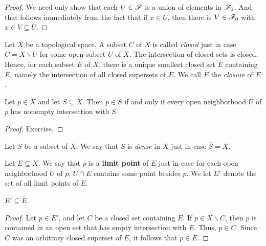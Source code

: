 \begin{proof} We need only show that each $U\in\mathscr F$ is a union of
  elements in $\mathscr F _0$.  And that follows immediately from the fact
  that if $x\in U$, then there is $V\in \mathscr F _0$ with $x\in V\subseteq
  U$. \end{proof}

\newcommand{\cl}[1]{\overline{#1}}

\begin{defn} Let $X$ be a topological space.  A subset $C$ of $X$ is
  called \emph{closed} just in case $C=X\backslash U$ for some open
  subset $U$ of $X$.  The intersection of closed sets is closed.
  Hence, for each subset $E$ of $X$, there is a unique smallest closed
  set $\cl{E}$ containing $E$, namely the intersection of all closed
  supersets of $E$.  We call $\overline{E}$ the \emph{closure} of
  $E$.  \end{defn}


\begin{prop} Let $p\in X$ and let $S\subseteq X$.  Then $p\in
  \overline{S}$ if and only if every open neighborhood $U$ of $p$ has
  nonempty intersection with $S$.  \end{prop}

\begin{proof} Exercise. \end{proof}

\begin{defn} Let $S$ be a subset of $X$.  We say that $S$ is
  \emph{dense} in $X$ just in case $\overline{S}=X$. \end{defn}

\begin{defn} Let $E\subseteq X$.  We say that $p$ is a \textbf{limit
    point} of $E$ just in case for each open neighborhood $U$ of $p$,
  $U\cap E$ contains some point besides $p$.  We let $E'$ denote the
  set of all limit points of $E$.  \end{defn}

\begin{lemma} $E'\subseteq \overline{E}$.  \end{lemma}

\begin{proof} Let $p\in E'$, and let $C$ be a closed set containing
  $E$.  If $p\in X\backslash C$, then $p$ is contained in an open set
  that has empty intersection with $E$.  Thus, $p\in C$.  Since $C$
  was an arbitrary closed superset of $E$, it follows that
  $p\in\overline{E}$.
\end{proof}

